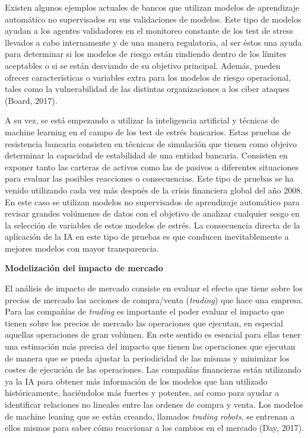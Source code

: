 \documentclass[]{DissertateUSU}
\begin{document}
\noindent Existen algunos ejemplos actuales de bancos que utilizan
modelos de aprendizaje automático no supervisados en sus validaciones de
modelos. Este tipo de modelos ayudan a los agentes validadores en el
monitoreo constante de los test de stress llevados a cabo internamente y
de una manera regulatoria, al ser éstos una ayuda para determinar si los
modelos de riesgo están rindiendo dentro de los límites aceptables o si
se están desviando de su objetivo principal. Además, pueden ofrecer
características o variables extra para los modelos de riesgo
operacional, tales como la vulnerabilidad de las distintas
organizaciones a los ciber ataques (Board, 2017).

\setlength\parskip{7ex}

\noindent A su vez, se está empezando a utilizar la inteligencia
artificial y técnicas de machine learning en el campo de los test de
estrés bancarios. Estas pruebas de resistencia bancaria consisten en
técnicas de simulación que tienen como objeivo determinar la capacidad
de estabilidad de una entidad bancaria. Consisten en exponer tanto las
carteras de activos como las de pasivos a diferentes situaciones para
evaluar las posibles reacciones o consecuencias. Este tipo de pruebas se
ha venido utilizando cada vez más después de la crisis financiera global
del año 2008. En este caso se utilizan modelos no supervisados de
aprendizaje automático para revisar grandes volúmenes de datos con el
objetivo de analizar cualquier sesgo en la selección de variables de
estos modelos de estrés. La consecuencia directa de la aplicación de la
IA en este tipo de pruebas es que conducen inevitablemente a mejores
modelos con mayor transparencia.

\setlength\parskip{5ex}

\textbf{Modelización del impacto de mercado}

\noindent El análisis de impacto de mercado consiste en evaluar el
efecto que tiene sobre los precios de mercado las acciones de
compra/venta (\emph{trading}) que hace una empresa. Para las compañías
de \emph{trading} es importante el poder evaluar el impacto que tienen
sobre los precios de mercado las operaciones que ejecutan, en especial
aquellas operaciones de gran volúmen. En este sentido es esencial para
ellas tener una estimación más precisa del impacto que tienen las
operaciones que ejecutan de manera que se pueda ajustar la periodicidad
de las mismas y minimizar los costes de ejecución de las operaciones.
Las compañías financieras están utilizando ya la IA para obtener más
información de los modelos que han utilizado históricamente, haciéndolos
más fuertes y potentes, así como para ayudar a identificar relaciones no
lineales entre las ordenes de compra y venta. Los modelos de machine
leaning que se están creando, llamados \emph{trading robots}, se
entrenan a ellos mismos para saber cómo reaccionar a los cambios en el
mercado (Day, 2017).
\end{document}
